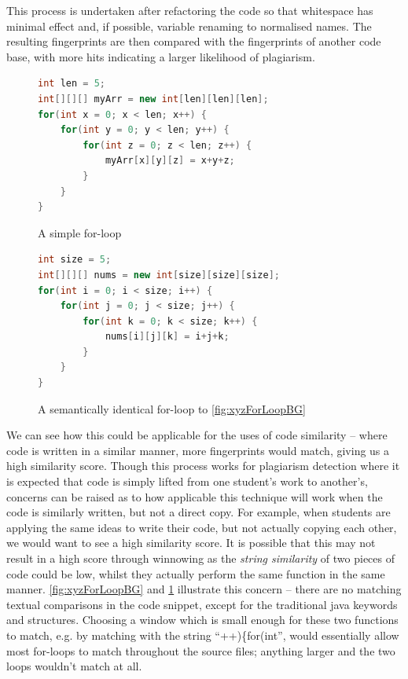 This process is undertaken after refactoring the code so that whitespace
has minimal effect and, if possible, variable renaming to normalised names.
The resulting fingerprints are then compared with the fingerprints of another
code base, with more hits indicating a larger likelihood of plagiarism.

\begin{figure}[H]
\begin{minipage}[b]{0.45\linewidth}
\begin{lstlisting}[language=Java]
int len = 5;
int[][][] myArr = new int[len][len][len];
for(int x = 0; x < len; x++) {
	for(int y = 0; y < len; y++) {
		for(int z = 0; z < len; z++) {
			myArr[x][y][z] = x+y+z;
		}
	}
}
\end{lstlisting}
\caption{A simple for-loop}
\label{fig:xyzForLoopBG}
\end{minipage}
\hspace{0.5cm}
\begin{minipage}[b]{0.45\linewidth}
\begin{lstlisting}[language=Java]
int size = 5;
int[][][] nums = new int[size][size][size];
for(int i = 0; i < size; i++) {
	for(int j = 0; j < size; j++) {
		for(int k = 0; k < size; k++) {
			nums[i][j][k] = i+j+k;
		}
	}
}
\end{lstlisting}
\caption{A semantically identical for-loop to \cref{fig:xyzForLoopBG}}
\label{fig:ijkForLoopBG}
\end{minipage}
\end{figure}

We can see how this could be applicable for the uses of code similarity -- 
where code is written in a similar manner, more fingerprints would match,
giving us a high similarity score. Though this process works for plagiarism detection
where it is expected that code is simply lifted from one student's work to
another's, concerns can be raised as to how applicable this technique will work
when the code is similarly written, but not a direct copy. For example, when 
students are applying the same ideas to write their code, but not actually
copying each other, we would want to see a high similarity score. It is possible
that this may not result in a high score through winnowing as the \emph{string
similarity} of two pieces of code could be low, whilst they actually perform
the same function in the same manner. \cref{fig:xyzForLoopBG} and
\cref{fig:ijkForLoopBG} illustrate this concern -- there are no matching
textual comparisons in the code snippet, except for the traditional java
keywords and structures. Choosing a window which is small enough for
these two functions to match, e.g. by matching with the string 
``++)\{for(int'', would essentially allow most for-loops to match throughout
the source files; anything larger and the two loops wouldn't match at all.

